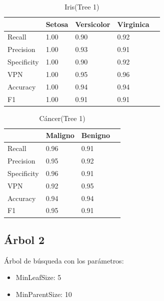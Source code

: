 \documentclass[a4paper,openwrite,12pt]{article}
\begin{document}
\begin{table}[H]
\centering
\begin{tabular}{@{}lllll@{}}
\toprule
            & Setosa & Versicolor & Virginica &  \\ \midrule
Recall      & 1.00   & 0.90       & 0.92      &  \\
Precision   & 1.00   & 0.93       & 0.91      &  \\
Specificity & 1.00   & 0.90       & 0.92      &  \\
VPN         & 1.00   & 0.95       & 0.96      &  \\
Accuracy    & 1.00   & 0.94       & 0.94      &  \\
F1          & 1.00   & 0.91       & 0.91      &  \\ \bottomrule
\end{tabular}
\caption{Iris(Tree 1)}
\end{table}


\begin{table}[H]
\centering
\begin{tabular}{@{}llll@{}}
\toprule
            & Maligno & Benigno &  \\ \midrule
Recall      & 0.96    & 0.91    &  \\
Precision   & 0.95    & 0.92    &  \\
Specificity & 0.96    & 0.91    &  \\
VPN         & 0.92    & 0.95    &  \\
Accuracy    & 0.94    & 0.94    &  \\
F1          & 0.95    & 0.91    &  \\ \bottomrule
\end{tabular}
\caption{Cáncer(Tree 1)}
\end{table}




\subsection{Árbol 2}
Árbol de búsqueda con los parámetros:

\begin{itemize}
    \item MinLeafSize: 5
    \item MinParentSize: 10
\end{itemize}
\end{document}
